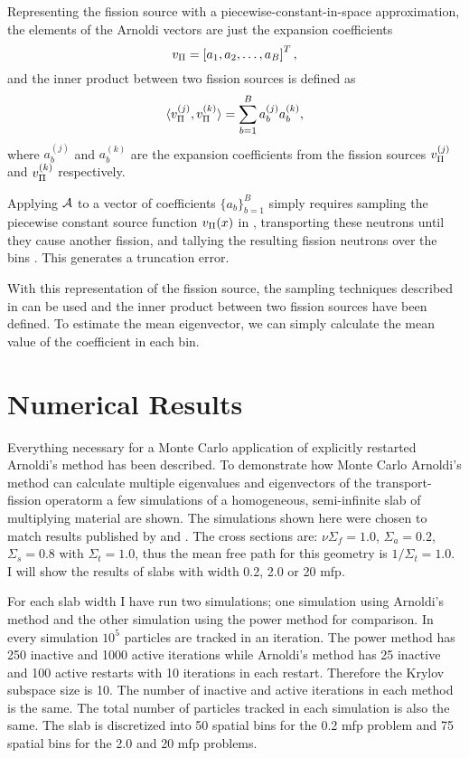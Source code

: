 Representing the fission source with a piecewise-constant-in-space approximation, the elements of the Arnoldi vectors are just the expansion coefficients 
\begin{equation}
    v_{\Pi} = \left[a_1, a_2, \ldots, a_B\right]^T,
\end{equation}
and the inner product between two fission sources is defined as
\begin{equation}
    \langle v_{\Pi}^{(j)},v_{\Pi}^{(k)}\rangle = \sum_{b=1}^B a_b^{(j)}a_b^{(k)},
    \label{eq:InnerProductFissionSources}
\end{equation}
where $a_b^{(j)}$ and $a_b^{(k)}$ are the expansion coefficients from the fission sources $v_{\Pi}^{(j)}$ and $v_{\Pi}^{(k)}$ respectively.

Applying $\mathcal{A}$ to a vector of coefficients $\{a_b\}_{b=1}^B$ simply requires sampling the piecewise constant source function $v_{\Pi}(x)$ in , transporting these neutrons until they cause another fission, and tallying the resulting fission neutrons over the bins \citep[see][]{Conlin:2008Arnol-0}.  This generates a truncation error.

With this representation of the fission source, the sampling techniques described in  can be used and the inner product between two fission sources have been defined.  To estimate the mean eigenvector, we can  simply calculate the mean value of the coefficient in each bin.  

\section{Numerical Results \label{sec:ArnoldiResults}}
Everything necessary for a Monte Carlo application of explicitly restarted Arnoldi's method has been described.  To demonstrate how Monte Carlo Arnoldi's method can calculate multiple eigenvalues and eigenvectors of the transport-fission operatorm a few simulations of a homogeneous, semi-infinite slab of multiplying material are shown.  The simulations shown here were chosen to match results published by \cite{Garis:1991One-s-0,Modak:1995Evalu-0} and \cite{Dahl:1979Eigen-0}.  The cross sections are: \mbox{$\nu\Sigma_f = 1.0$}, \mbox{$\Sigma_a = 0.2$}, \mbox{$\Sigma_s = 0.8$} with \mbox{$\Sigma_t = 1.0$}, thus the mean free path for this geometry is $1/\Sigma_t = 1.0$.  I will show the results of slabs with width 0.2, 2.0 or 20 mfp.

For each slab width I have run two simulations; one simulation using Arnoldi's method and the other simulation using the power method for comparison.  In every simulation $10^5$ particles are tracked in an iteration.  The power method has 250 inactive and 1000 active iterations while Arnoldi's method has 25 inactive and 100 active restarts with 10 iterations in each restart.  Therefore the Krylov subspace size is 10.  The number of inactive and active iterations in each method is the same.  The total number of particles tracked in each simulation is also the same.  The slab is discretized into 50 spatial bins for the 0.2 mfp problem and 75 spatial bins for the 2.0 and 20 mfp problems.

